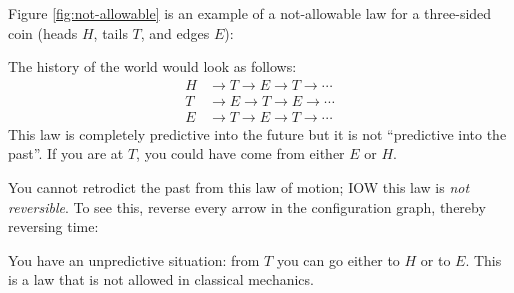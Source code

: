 \documentclass[pagesize,headsepline,10pt,parskip=half]{scrreprt}
\begin{document}
        Figure \ref{fig:not-allowable} is an example of a not-allowable law for
        a three-sided coin (heads $H$, tails $T$, and edges $E$):
        \begin{center}
          \label{fig:not-allowable}
        \end{center}
        The history of the world would look as follows:
        \begin{align*}
          H &\rightarrow T \rightarrow E \rightarrow T \rightarrow \cdots \\
          T &\rightarrow E \rightarrow T \rightarrow E \rightarrow \cdots \\
          E &\rightarrow T \rightarrow E \rightarrow T \rightarrow \cdots
        \end{align*}
        This law is completely predictive into the future but it is not
        ``predictive into the past''.  If you are at $T$, you could have come
        from either $E$ or $H$.

        You cannot retrodict the past from this law of motion; IOW this law is
        \emph{not reversible}.  To see this, reverse every arrow in the
        configuration graph, thereby reversing time:
         \begin{center}
        \end{center}
        You have an unpredictive situation: from $T$ you can go either
        to $H$ or to $E$. This is a law that is not allowed in classical
        mechanics.
\end{document}
